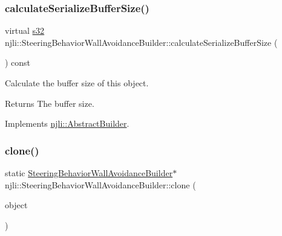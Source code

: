 \mbox{\label{classnjli_1_1_steering_behavior_wall_avoidance_builder_ac7188fa4580e7f9e302f54bc3e6ce63a}} 
\subsubsection{\texorpdfstring{calculate\+Serialize\+Buffer\+Size()}{calculateSerializeBufferSize()}}
{\footnotesize\ttfamily virtual \mbox{\hyperlink{_util_8h_aa62c75d314a0d1f37f79c4b73b2292e2}{s32}} njli\+::\+Steering\+Behavior\+Wall\+Avoidance\+Builder\+::calculate\+Serialize\+Buffer\+Size (\begin{DoxyParamCaption}{ }\end{DoxyParamCaption}) const\hspace{0.3cm}{\ttfamily [virtual]}}

Calculate the buffer size of this object.

\begin{DoxyReturn}{Returns}
The buffer size. 
\end{DoxyReturn}


Implements \mbox{\hyperlink{classnjli_1_1_abstract_builder_aa1d220053e182c37b31b427499c6eacf}{njli\+::\+Abstract\+Builder}}.

\mbox{\label{classnjli_1_1_steering_behavior_wall_avoidance_builder_a94e0a55627424bb4e7aca4868c35ab62}} 
\subsubsection{\texorpdfstring{clone()}{clone()}}
{\footnotesize\ttfamily static \mbox{\hyperlink{classnjli_1_1_steering_behavior_wall_avoidance_builder}{Steering\+Behavior\+Wall\+Avoidance\+Builder}}$\ast$ njli\+::\+Steering\+Behavior\+Wall\+Avoidance\+Builder\+::clone (\begin{DoxyParamCaption}\item[{const \mbox{\hyperlink{classnjli_1_1_steering_behavior_wall_avoidance_builder}{Steering\+Behavior\+Wall\+Avoidance\+Builder}} \&}]{object }\end{DoxyParamCaption})\hspace{0.3cm}{\ttfamily [static]}}

